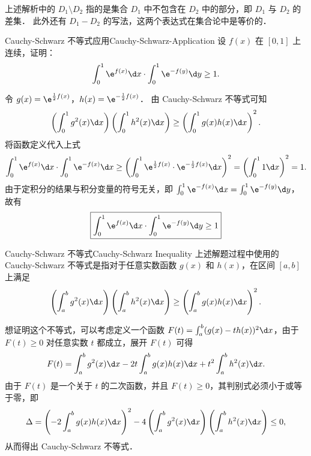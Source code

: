 \begin{note}{}{}
    上述解析中的 $D_1 \setminus D_2$ 指的是集合 $D_1$ 中不包含在 $D_2$ 中的部分，即 $D_1$ 与 $D_2$ 的差集．
    此外还有 $D_1 - D_2$ 的写法，这两个表达式在集合论中是等价的．

\end{note}


\begin{problem}{Cauchy-Schwarz 不等式应用}{Cauchy-Schwarz-Application}
    设 $f(x)$ 在 $[0, 1]$ 上连续，证明：
    \begin{equation}
        \int_0^1 \e^{f(x)} \d x \cdot \int_0^1 \e^{-f(y)} \d y \ge 1.
    \end{equation}
\end{problem}

\begin{myproof}
    令 $g(x) = \e^{\frac{1}{2} f(x)}$，$h(x) = \e^{-\frac{1}{2} f(x)}$．
    由 Cauchy-Schwarz 不等式可知
    \begin{equation}
        \left( \int_0^1 g^2(x) \d x \right) \left( \int_0^1 h^2(x) \d x \right) \ge \left( \int_0^1 g(x) h(x) \d x \right)^2.
    \end{equation}
    将函数定义代入上式
    \begin{equation}
        \int_0^1 \e^{f(x)} \d x \cdot \int_0^1 \e^{-f(x)} \d x \ge \left( \int_0^1 \e^{\frac{1}{2} f(x)} \cdot \e^{-\frac{1}{2} f(x)} \d x \right)^2 = \left( \int_0^1 1 \d x \right)^2 = 1.
    \end{equation}
    由于定积分的结果与积分变量的符号无关，即 $\int_0^1 \e^{-f(x)} \d x = \int_0^1 \e^{-f(y)} \d y$，故有
    \begin{equation}
        \boxed{\int_0^1 \e^{f(x)} \d x \cdot \int_0^1 \e^{-f(y)} \d y \ge 1}
    \end{equation}
\end{myproof}

\begin{note}{Cauchy-Schwarz 不等式}{Cauchy-Schwarz Inequality}
    上述解题过程中使用的 Cauchy-Schwarz 不等式是指对于任意实数函数 $g(x)$ 和 $h(x)$，在区间 $[a, b]$ 上满足
    \begin{equation}
        \left( \int_a^b g^2(x) \d x \right) \left( \int_a^b h^2(x) \d x \right) \ge \left( \int_a^b g(x) h(x) \d x \right)^2.
    \end{equation}

    想证明这个不等式，可以考虑定义一个函数 $F(t) = \int_a^b (g(x) - t h(x))^2 \d x$，由于 $F(t) \ge 0$ 对任意实数 $t$ 都成立，展开 $F(t)$ 可得
    \begin{equation}
        F(t) = \int_a^b g^2(x) \d x - 2t \int_a^b g(x) h(x) \d x + t^2 \int_a^b h^2(x) \d x.
    \end{equation}
    由于 $F(t)$ 是一个关于 $t$ 的二次函数，并且 $F(t) \ge 0$，其判别式必须小于或等于零，即
    \begin{equation}
        \Delta = \left( -2 \int_a^b g(x) h(x) \d x \right)^2 - 4 \left( \int_a^b g^2(x) \d x \right) \left( \int_a^b h^2(x) \d x \right) \le 0,
    \end{equation}
    从而得出 Cauchy-Schwarz 不等式．

\end{note}


